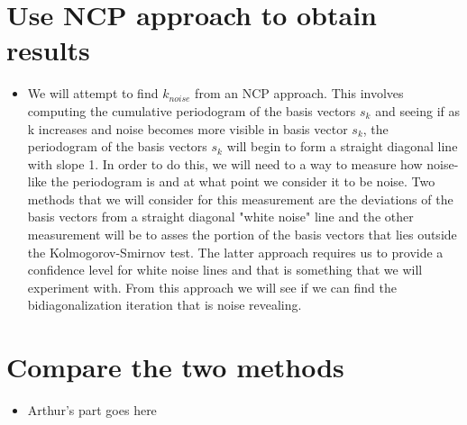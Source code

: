 \documentclass[11pt]{amsart}
\begin{document}
\section{Use NCP approach to obtain results}
\begin{itemize}
\item We will attempt to find $k_{noise}$ from an NCP approach. This involves computing the cumulative periodogram of the basis vectors $s_k$ and seeing if as k increases and noise becomes more visible in basis vector $s_k$, the periodogram of the basis vectors $s_k$ will begin to form a straight diagonal line with slope 1. In order to do this, we will need to a way to measure how noise-like the periodogram is and at what point we consider it to be noise. Two methods that we will consider for this measurement are the deviations of the basis vectors from a straight diagonal "white noise" line and the other measurement will be to asses the portion of the basis vectors that lies outside the Kolmogorov-Smirnov test. The latter approach requires us to provide a confidence level for white noise lines and that is something that we will experiment with. From this approach we will see if we can find the bidiagonalization iteration that is noise revealing.
\end{itemize}

\section{Compare the two methods}
\begin{itemize}
\item Arthur's part goes here
\end{itemize}
\end{document}

